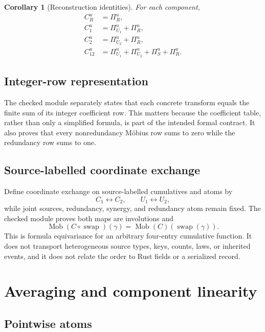 \documentclass[11pt]{article}
\newtheorem{corollary}[theorem]{Corollary}
\theoremstyle{definition}
\newcommand{\Mob}{\operatorname{Mob}}
\begin{document}
\begin{corollary}[Reconstruction identities]\label{cor:reconstruct}
For each component,
\begin{align}
C^u_R&=\Pi^u_R,\\
C^u_1&=\Pi^u_{U_1}+\Pi^u_R,\\
C^u_2&=\Pi^u_{U_2}+\Pi^u_R,\\
C^u_{12}&=\Pi^u_{U_1}+\Pi^u_{U_2}+\Pi^u_S+\Pi^u_R.
\end{align}
\end{corollary}

\subsection{Integer-row representation}

The checked module separately states that each concrete transform equals the finite sum of its integer
coefficient row.  This matters because the coefficient table, rather than only a simplified
formula, is part of the intended formal contract.  It also proves that every nonredundancy
M\"obius row sums to zero while the redundancy row sums to one.

\subsection{Source-labelled coordinate exchange}

Define coordinate exchange on source-labelled cumulatives and atoms by
\begin{equation}\label{eq:swap}
C_1\leftrightarrow C_2,
\qquad U_1\leftrightarrow U_2,
\end{equation}
while joint sources, redundancy, synergy, and redundancy atom remain fixed.  The checked module proves
both maps are involutions and
\begin{equation}\label{eq:equivariant}
\Mob(C\circ\operatorname{swap})(\gamma)
=\Mob(C)(\operatorname{swap}(\gamma)).
\end{equation}
This is formula equivariance for an arbitrary four-entry cumulative function.  It does not
transport heterogeneous source types, keys, counts, laws, or inherited events, and it does not
relate the order to Rust fields or a serialized record.

\section{Averaging and component linearity}

\subsection{Pointwise atoms}
\end{document}
